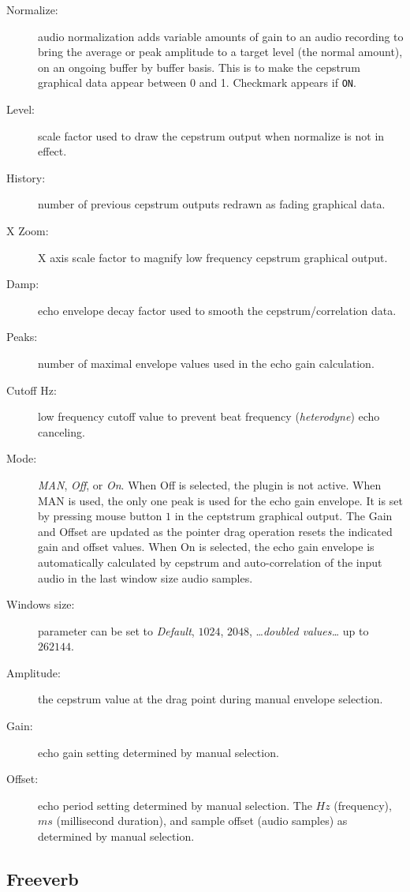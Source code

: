 \begin{description}
    \item[Normalize:] audio normalization adds variable amounts of gain to an audio recording to bring the average or peak amplitude to a target level (the normal amount), on an ongoing buffer by buffer basis. This is to make the cepstrum graphical data appear between 0 and 1. Checkmark appears if \texttt{ON}.
    \item[Level:] scale factor used to draw the cepstrum output when normalize is not in effect.
    \item[History:] number of previous cepstrum outputs redrawn as fading graphical data.
    \item[X Zoom:] X axis scale factor to magnify low frequency cepstrum graphical output.
    \item[Damp:] echo envelope decay factor used to smooth the cepstrum/correlation data.
    \item[Peaks:] number of maximal envelope values used in the echo gain calculation.
    \item[Cutoff Hz:] low frequency cutoff value to prevent beat frequency (\textit{heterodyne}) echo canceling.
    \item[Mode:] \textit{MAN}, \textit{Off}, or \textit{On}. When Off is selected, the plugin is not active. When MAN is used, the only one peak is used for the echo gain envelope. It is set by pressing mouse button $1$ in the ceptstrum graphical output. The Gain and Offset are updated as the pointer drag operation resets the indicated gain and offset values. When On is selected, the echo gain envelope is automatically calculated by cepstrum and auto-correlation of the input audio in the last window size audio samples.
    \item[Windows size:] parameter can be set to \textit{Default}, $1024$, $2048$, \dots \textit{doubled values\dots} up to $262144$.
    \item[Amplitude:] the cepstrum value at the drag point during manual envelope selection.
    \item[Gain:] echo gain setting determined by manual selection.
    \item[Offset:] echo period setting determined by manual selection. The $Hz$ (frequency), $ms$ (millisecond duration), and sample offset (audio samples) as determined by manual selection.
\end{description}

\subsection{Freeverb}%
\label{sub:freeverb}

